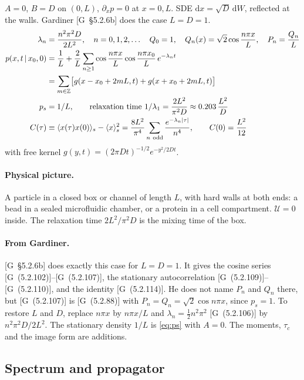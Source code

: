 \documentclass[11pt]{article}
\numberwithin{equation}{section}
\newcommand{\dd}{\mathrm{d}}
\newcommand{\avg}[1]{\langle #1\rangle}
\newcommand{\given}{\,|\,}
\newcommand{\nodd}{\sum_{n\ \mathrm{odd}}}
\newcommand{\G}[1]{[G~(#1)]}
\newcommand{\Gs}[1]{[G~\S#1]}
\begin{document}
\begin{keyresults}
$A=0$, $B=D$ on $(0,L)$, $\partial_xp=0$ at $x=0,L$. SDE $\dd x=\sqrt D\,\dd W$, reflected at the walls.
Gardiner \Gs{5.2.6b} does the case $L=D=1$.
\begin{align}
  \lambda_n &= \frac{n^2\pi^2D}{2L^2},\quad n=0,1,2,\dots \quad
  Q_0=1,\quad Q_n(x)=\sqrt2\cos\frac{n\pi x}{L},\quad P_n=\frac{Q_n}L \label{eq:R-spectrum}\\
  p(x,t\given x_0,0) &= \frac1L + \frac2L\sum_{n\ge1}\cos\frac{n\pi x}{L}\cos\frac{n\pi x_0}{L}\,e^{-\lambda_nt} \notag\\
  &= \sum_{m\in\mathbb Z}\bigl[g(x-x_0+2mL,t)+g(x+x_0+2mL,t)\bigr] \label{eq:R-prop}\\
  p_s &= 1/L, \qquad \text{relaxation time } 1/\lambda_1 = \frac{2L^2}{\pi^2D}\approx 0.203\,\frac{L^2}{D}\\
  C(\tau) &\equiv \avg{x(\tau)x(0)}_s-\avg{x}_s^2 = \frac{8L^2}{\pi^4}\nodd\frac{e^{-\lambda_n|\tau|}}{n^4},
  \qquad C(0)=\frac{L^2}{12}
\end{align}
with free kernel $g(y,t)=(2\pi Dt)^{-1/2}e^{-y^2/2Dt}$.
\end{keyresults}

\paragraph{Physical picture.} A particle in a closed box or channel of length $L$, with hard walls at both
ends: a bead in a sealed microfluidic chamber, or a protein in a cell compartment. $\mathcal U=0$ inside. The
relaxation time $2L^2/\pi^2D$ is the mixing time of the box.

\paragraph{From Gardiner.} \Gs{5.2.6b} does exactly this case for $L=D=1$. It gives the cosine series
\G{5.2.102}--\G{5.2.107}, the stationary autocorrelation \G{5.2.109}--\G{5.2.110}, and the identity \G{5.2.114}.
He does not name $P_n$ and $Q_n$ there, but \G{5.2.107} is \G{5.2.88} with $P_n=Q_n=\sqrt2\cos n\pi x$, since
$p_s=1$.
To restore $L$ and $D$, replace $n\pi x$ by $n\pi x/L$ and $\lambda_n=\tfrac12n^2\pi^2$ \G{5.2.106} by
$n^2\pi^2D/2L^2$. The stationary density $1/L$ is \cref{eq:ps} with $A=0$. The moments, $\tau_c$ and the image
form are additions.

\subsection{Spectrum and propagator}
\end{document}
